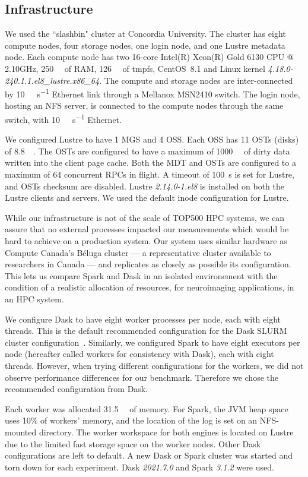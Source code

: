 \documentclass[AMA,STIX1COL]{WileyNJD-v2}
\newcommand{\HL}[1]{#1}
\begin{document}
\subsection{Infrastructure}
We used the ``slashbin" cluster at Concordia University.
The cluster has eight compute nodes, four storage nodes, one login node, and one Lustre metadata node.
Each compute node has two 16-core Intel(R) Xeon(R) Gold 6130 CPU @ 2.10GHz,
\SI{250}{\gibi\byte} of RAM, \SI{126}{\gibi\byte} of tmpfs,
CentOS~8.1 and Linux kernel \textit{4.18.0-240.1.1.el8\_lustre.x86\_64}.
The compute and storage nodes are inter-connected by {\SI{10}{\giga\bit\per\second}} Ethernet link through a Mellanox MSN2410 switch.
The login node, hosting an NFS server, is connected to the compute nodes through the same switch, with {\SI{10}{\giga\bit\per\second}} Ethernet.
				
We configured Lustre to have 1 MGS and 4 OSS.
Each OSS has 11 OSTs (disks) of \SI{8.8}{\tebi\byte}.
The OSTs are configured to have a maximum of \SI{1000}{\mebi\byte} of dirty data written into the client page cache.
Both the MDT and OSTs are configured to a maximum of 64 concurrent RPCs in flight.
A timeout of \SI{100}{\second} is set for Lustre, and OSTs checksum are disabled.
Lustre \textit{2.14.0-1.el8} is installed on both the Lustre clients and servers.
We used the default inode configuration for Lustre.

\HL{
	While our infrastructure is not of the scale of TOP500 HPC systems,
	we can assure that no external processes
	impacted our measurements which would be hard to achieve on a production system.
	Our system uses similar hardware as Compute Canada's B\'eluga cluster
	--- a representative cluster available to researchers in Canada --- and 
	replicates as closely as possible its configuration.
	This lets us compare Spark and Dask in an isolated environement with the condition 
	of a realistic  allocation of resources, for neuroimaging applications, in an HPC system.
}
					
\HL{
	We configure Dask to have eight worker processes per node, each with eight threads.
	This is the default recommended configuration for the Dask SLURM cluster 
	configuration~{\cite{DaskSLURMDoc}}.
	Similarly, we configured Spark to have eight executors per node
	(hereafter called workers for consistency with Dask), each with eight threads.
	However, when trying different configurations for the workers, we did not
	observe performance differences for our benchmark.
	Therefore we chose the recommended configuration from Dask.
}
Each worker was allocated \SI{31.5}{\gibi\byte} of memory.
For Spark, the JVM heap space uses 10\% of workers' memory, and the location of the log is set on an NFS-mounted directory.
The worker workspace for both engines is located on Lustre due to the limited fast storage space on the worker nodes.
Other Dask configurations are left to default.
A new Dask or Spark cluster was started and torn down for each experiment.
Dask \textit{2021.7.0} and Spark \textit{3.1.2} were used.
						
\end{document}
